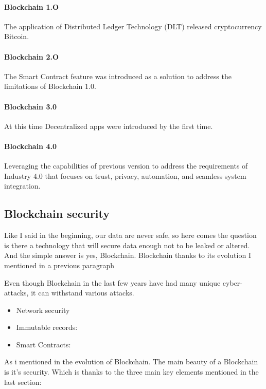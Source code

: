 \documentclass[10pt,english,a4paper]{article}
\begin{document}
\paragraph{Blockchain 1.O}
The application of Distributed Ledger Technology (DLT) released cryptocurrency Bitcoin.
\cite{Suroso:SKCK}
\paragraph{Blockchain 2.O}
The Smart Contract feature was introduced as a solution to address the limitations of Blockchain 1.0.
\cite{Suroso:SKCK}
\paragraph{Blockchain 3.0}
At this time Decentralized apps were introduced by the first time. 
\cite{Suroso:SKCK}
\paragraph{Blockchain 4.0}
Leveraging the capabilities of previous version to address the requirements of Industry 4.0 that focuses on trust, privacy, automation, and seamless system integration.
\cite{Suroso:SKCK}

\subsection{Blockchain security} %
Like I said in the beginning, our data are never safe, so here comes the question is there a technology that will secure data enough not to be leaked or altered. And the simple answer is yes, Blockchain. Blockchain thanks to its evolution I mentioned in a previous paragraph 

Even though Blockchain in the last few years have had many unique cyber-attacks, it can withstand various attacks. 
\begin{itemize}
    \item Network security
    \item Immutable records:
    \item Smart Contracts:
\end{itemize}
   
\cite{Xiaofen:Blockchain-security}

As i mentioned in the evolution of Blockchain. The main beauty of a Blockchain is it's security. Which is thanks to the three main key elements mentioned in the last section:
\end{document}
